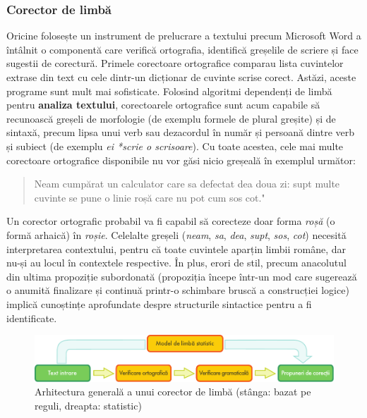 \begin{multicols}{2}
\subsubsection{Corector de limbă}
Oricine folosește un instrument de prelucrare a textului precum Microsoft Word a întâlnit o componentă care verifică ortografia, identifică greșelile de scriere și face sugestii de corectură. Primele corectoare ortografice comparau lista cuvintelor extrase din text cu cele dintr-un dicționar de cuvinte scrise corect. Astăzi, aceste programe sunt mult mai sofisticate. Folosind algoritmi dependenți de limbă pentru \textbf{analiza textului}, corectoarele ortografice sunt acum capabile să recunoască greșeli de morfologie (de exemplu formele de plural greșite) și de sintaxă, precum lipsa unui verb sau dezacordul în număr și persoană dintre verb și subiect (de exemplu \textit{ei *scrie o scrisoare}). Cu toate acestea, cele mai multe corectoare ortografice disponibile nu vor găsi nicio greșeală în exemplul următor:
 
\begin{quote}
Neam cumpărat un calculator care sa defectat dea doua zi: supt multe cuvinte se pune o linie roșă care nu pot cum sos cot."\end{quote}

Un corector ortografic probabil va fi capabil să corecteze doar forma \textit{roșă} (o formă arhaică) în \textit{roșie}. Celelalte greșeli (\textit{neam}, \textit{sa}, \textit{dea}, \textit{supt}, \textit{sos}, \textit{cot}) necesită interpretarea contextului, pentru că toate cuvintele aparțin limbii române, dar nu-și au locul în contextele respective. În plus, erori de stil, precum anacolutul din ultima propoziție subordonată (propoziția începe într-un mod care sugerează o anumită finalizare și continuă printr-o schimbare bruscă a construcției logice) implică cunoștințe aprofundate despre structurile sintactice pentru a fi identificate.

\begin{figure}[htb]
\center
\includegraphics[width=\textwidth]{../_media/romanian/language_checking}
\caption{Arhitectura generală a unui corector de limbă (stânga: bazat pe reguli, dreapta: statistic)}
\label{fig:langcheckingaarch_ro}
\end{figure}


\end{multicols}
